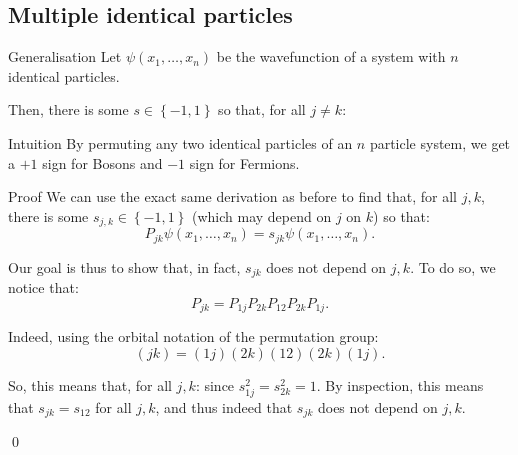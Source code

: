 \documentclass[a4paper]{article}
\begin{document}
\subsection{Multiple identical particles}

\begin{parag}{Generalisation}
    Let $\psi\left(x_1, \ldots, x_n\right)$ be the wavefunction of a system with $n$ identical particles.

    Then, there is some $s \in \left\{-1, 1\right\}$ so that, for all $j \neq k$: 

    \begin{subparag}{Intuition}
        By permuting any two identical particles of an $n$ particle system, we get a $+1$ sign for Bosons and $-1$ sign for Fermions. 
    \end{subparag}

    \begin{subparag}{Proof}
        We can use the exact same derivation as before to find that, for all $j, k$, there is some $s_{j, k} \in \left\{-1, 1\right\}$ (which may depend on $j$ on $k$) so that: 
        \[P_{jk} \psi\left(x_1, \ldots, x_n\right) = s_{jk} \psi\left(x_1, \ldots, x_n\right).\]

        Our goal is thus to show that, in fact, $s_{jk}$ does not depend on $j, k$. To do so, we notice that:
        \[P_{jk} = P_{1j} P_{2k} P_{12} P_{2k} P_{1j}.\]

        Indeed, using the orbital notation of the permutation group: 
        \[\left(jk\right) = \left(1j\right)\left(2k\right)\left(12\right)\left(2k\right)\left(1j\right).\]
        
        So, this means that, for all $j, k$: 
        since $s_{1j}^2 = s_{2k}^2 = 1$. By inspection, this means that $s_{jk} = s_{12}$ for all $j, k$, and thus indeed that $s_{jk}$ does not depend on $j, k$.

        \qed
    \end{subparag}
\end{parag}
\end{document}
